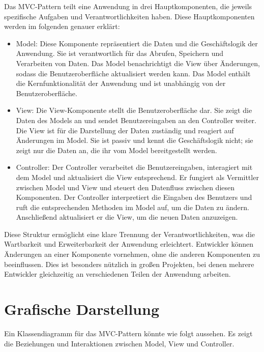 Das MVC-Pattern teilt eine Anwendung in drei Hauptkomponenten, die jeweils spezifische Aufgaben und Verantwortlichkeiten haben. Diese Hauptkomponenten werden im folgenden genauer erklärt:
\begin{itemize}

\item Model: Diese Komponente repräsentiert die Daten und die Geschäftslogik der Anwendung. Sie ist verantwortlich für das Abrufen, Speichern und Verarbeiten von Daten. Das Model benachrichtigt die View über Änderungen, sodass die Benutzeroberfläche aktualisiert werden kann. Das Model enthält die Kernfunktionalität der Anwendung und ist unabhängig von der Benutzeroberfläche.

\item View: Die View-Komponente stellt die Benutzeroberfläche dar. Sie zeigt die Daten des Models an und sendet Benutzereingaben an den Controller weiter. Die View ist für die Darstellung der Daten zuständig und reagiert auf Änderungen im Model. Sie ist passiv und kennt die Geschäftslogik nicht; sie zeigt nur die Daten an, die ihr vom Model bereitgestellt werden.

\item Controller: Der Controller verarbeitet die Benutzereingaben, interagiert mit dem Model und aktualisiert die View entsprechend. Er fungiert als Vermittler zwischen Model und View und steuert den Datenfluss zwischen diesen Komponenten. Der Controller interpretiert die Eingaben des Benutzers und ruft die entsprechenden Methoden im Model auf, um die Daten zu ändern. Anschließend aktualisiert er die View, um die neuen Daten anzuzeigen.

\end{itemize}
Diese Struktur ermöglicht eine klare Trennung der Verantwortlichkeiten, was die Wartbarkeit und Erweiterbarkeit der Anwendung erleichtert. Entwickler können Änderungen an einer Komponente vornehmen, ohne die anderen Komponenten zu beeinflussen. Dies ist besonders nützlich in großen Projekten, bei denen mehrere Entwickler gleichzeitig an verschiedenen Teilen der Anwendung arbeiten.

\section{Grafische Darstellung}

Ein Klassendiagramm für das MVC-Pattern könnte wie folgt aussehen. Es zeigt die Beziehungen und Interaktionen zwischen Model, View und Controller.


